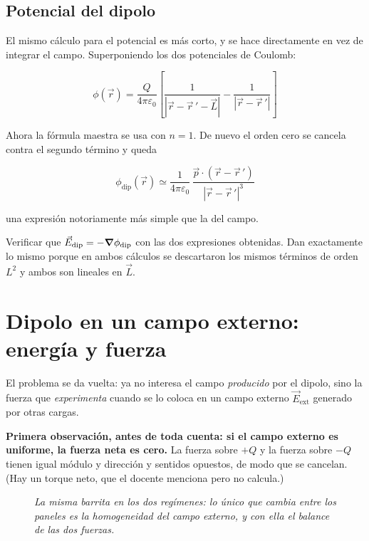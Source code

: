 \documentclass[12pt,a4paper]{article}
\begin{document}
\subsection{Potencial del dipolo}

El mismo cálculo para el potencial es más corto, y se hace directamente en vez de
integrar el campo. Superponiendo los dos potenciales de Coulomb:

\[
\phi(\vec r) = \frac{Q}{4\pi\varepsilon_0}\left[
  \frac{1}{|\vec r - \vec r\,' - \vec L|} - \frac{1}{|\vec r - \vec r\,'|}\right]
\]

Ahora la fórmula maestra se usa con $n = 1$. De nuevo el orden cero se cancela
contra el segundo término y queda

\[
\boxed{\;\phi_{\text{dip}}(\vec r) \simeq
  \frac{1}{4\pi\varepsilon_0}\,\frac{\vec p\cdot(\vec r - \vec r\,')}{|\vec r - \vec r\,'|^{3}}\;}
\]

una expresión notoriamente más simple que la del campo.

\begin{notebox}
Verificar que $\vec E_{\text{dip}} = -\grad\phi_{\text{dip}}$ con las dos
expresiones obtenidas. Dan exactamente lo mismo porque en ambos cálculos se
descartaron los mismos términos de orden $L^2$ y ambos son lineales en $\vec L$.
\end{notebox}

\section{Dipolo en un campo externo: energía y fuerza}

El problema se da vuelta: ya no interesa el campo \emph{producido} por el dipolo,
sino la fuerza que \emph{experimenta} cuando se lo coloca en un campo externo
$\vec E_{\text{ext}}$ generado por otras cargas.

\textbf{Primera observación, antes de toda cuenta: si el campo externo es
uniforme, la fuerza neta es cero.} La fuerza sobre $+Q$ y la fuerza sobre $-Q$
tienen igual módulo y dirección y sentidos opuestos, de modo que se cancelan. (Hay
un torque neto, que el docente menciona pero no calcula.)

\begin{figure}[H]
  \centering
  
  \caption*{\small\itshape La misma barrita en los dos regímenes: lo único que
  cambia entre los paneles es la homogeneidad del campo externo, y con ella el
  balance de las dos fuerzas.}
\end{figure}
\end{document}
